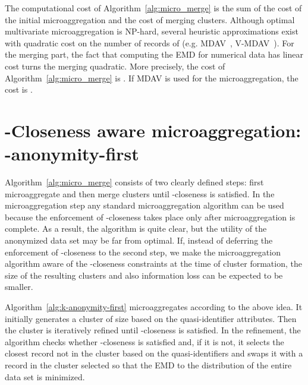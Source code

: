 \documentclass[10pt,journal,compsoc]{IEEEtran}
\theoremstyle{definition}
\theoremstyle{plain}
\begin{document}
The computational cost of Algorithm~\ref{alg:micro_merge} is the sum of the cost of the initial
microaggregation and the cost of merging clusters. 
Although optimal multivariate microaggregation is NP-hard, 
several heuristic approximations exist with quadratic cost 
on the number  of records
of  (e.g. MDAV~\cite{Domingo2005Ordinal}, V-MDAV~\cite{Solanas2006Vmdav}). For the merging
part, the fact that computing the EMD for numerical data has linear cost turns the merging 
quadratic. 
More precisely, the cost of Algorithm~\ref{alg:micro_merge} is 
. If MDAV is used for the microaggregation, the 
cost is .

\section{-Closeness aware microaggregation: -anonymity-first\label{sub:k-anonymity-first}}

Algorithm~\ref{alg:micro_merge} consists of two clearly defined steps: first
microaggregate and then merge clusters until -closeness
is satisfied. In the microaggregation step any standard microaggregation
algorithm can be used because the enforcement of -closeness
takes place only after microaggregation is complete. As a result,
the algorithm is quite clear, but the utility of the anonymized data
set may be far from optimal. If, instead of deferring the enforcement of
-closeness to the second step, we make the microaggregation algorithm
aware of the -closeness constraints at the time 
of cluster formation,
the size of the resulting clusters and also information loss 
can be expected to be smaller.

Algorithm~\ref{alg:k-anonymity-first} microaggregates according
to the above idea.
It initially generates a cluster of size  based on the quasi-identifier
attributes. Then the cluster is iteratively refined until -closeness
is satisfied. In the refinement, the algorithm checks whether 
-closeness is satisfied
and, if it is not, it selects the closest record not in the cluster based
on the quasi-identifiers and swaps it with a record in the cluster
selected
so that the EMD to the distribution of the entire data set is minimized. 
\end{document}
